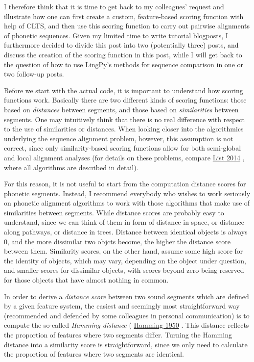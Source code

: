 \documentclass[
  a4paper,
  14pt,
  oneside,
  tablecaptionabove
]{scrbook}
\begin{document}
I therefore think that it is time to get back to my colleagues' request
and illustrate how one can first create a custom, feature-based scoring
function with help of CLTS, and then use this scoring function to carry
out pairwise alignments of phonetic sequences. Given my limited time to
write tutorial blogposts, I furthermore decided to divide this post into
two (potentially three) posts, and discuss the creation of the scoring
function in this post, while I will get back to the question of how to
use LingPy's methods for sequence comparison in one or two follow-up
posts.

Before we start with the actual code, it is important to understand how
scoring functions work. Basically there are two different kinds of
scoring functions: those based on \emph{distances} between segments, and
those based on \emph{similarities} between segments. One may intuitively
think that there is no real difference with respect to the use of
similarities or distances. When looking closer into the algorithmics
underlying the sequence alignment problem, however, this assumption is
not correct, since only similarity-based scoring functions allow for
both semi-global and local alignment analyses (for details on these
problems, compare
\href{http://bibliography.lingpy.org?key=List2014d}{List 2014} , where
all algorithms are described in detail).

For this reason, it is not useful to start from the computation distance
scores for phonetic segments. Instead, I recommend everybody who wishes
to work seriously on phonetic alignment algorithms to work with those
algorithms that make use of similarities between segments. While
distance scores are probably easy to understand, since we can think of
them in form of distance in space, or distance along pathways, or
distance in trees. Distance between identical objects is always 0, and
the more dissimilar two objcts become, the higher the distance score
between them. Similarity scores, on the other hand, assume some high
score for the identity of objects, which may vary, depending on the
object under question, and smaller scores for dissimilar objects, with
scores beyond zero being reserved for those objects that have almost
nothing in common.

In order to derive a \emph{distance score} between two sound segments
which are defined by a given feature system, the easiest and seemingly
most straightforward way (recommended and defended by some colleagues in
personal communication) is to compute the so-called \emph{Hamming
distance} (
\href{http://bibliography.lingpy.org?key=Hamming1950}{Hamming 1950} .
This distance reflects the proportion of features where two segments
differ. Turning the Hamming distance into a similarity score is
straightforward, since we only need to calculate the proportion of
features where two segments are identical.
\end{document}
